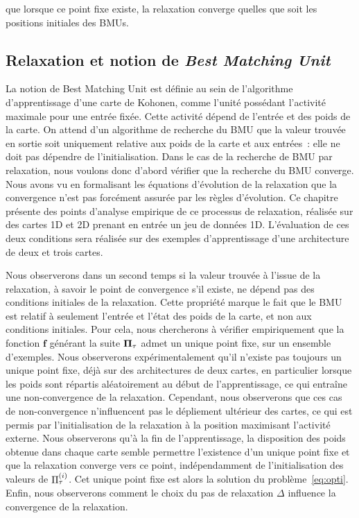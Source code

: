 \documentclass[../main]{subfiles}
\begin{document}
 que lorsque ce point fixe existe, la relaxation converge quelles que soit les positions initiales des BMUs.

\subsection{Relaxation et notion de \emph{Best Matching Unit}}

La notion de Best Matching Unit est définie au sein de l'algorithme d'apprentissage d'une carte de Kohonen, comme l'unité possédant l'activité maximale pour une entrée fixée. 
Cette activité dépend de l'entrée et des poids de la carte.
On attend d'un algorithme de recherche du BMU que la valeur trouvée en sortie soit uniquement relative aux poids de la carte et aux entrées~: elle ne doit pas dépendre de l'initialisation.
Dans le cas de la recherche de BMU par relaxation, nous voulons donc d'abord vérifier que la recherche du BMU converge.
Nous avons vu en formalisant les équations d'évolution de la relaxation que la convergence n'est pas forcément assurée par les règles d'évolution.
Ce chapitre présente des points d'analyse empirique de ce processus de relaxation, réalisée sur des cartes 1D et 2D prenant en entrée un jeu de données 1D.
L'évaluation de ces deux conditions sera réalisée sur des exemples d'apprentissage d'une architecture de deux et trois cartes. 


Nous observerons dans un second temps si la valeur trouvée à l'issue de la relaxation, à savoir le point de convergence s'il existe, ne dépend pas des conditions initiales de la relaxation.
Cette propriété marque le fait que le BMU est relatif à seulement l'entrée et l'état des poids de la carte, et non aux conditions initiales.
Pour cela, nous chercherons à vérifier empiriquement que la fonction $\mathbf{f}$ générant la suite $\mathbf{\Pi}_\tau$ admet un unique point fixe, sur un ensemble d'exemples. 
Nous observerons expérimentalement qu'il n'existe pas toujours un unique point fixe, déjà sur des architectures de deux cartes, en particulier lorsque les poids sont répartis aléatoirement au début de l'apprentissage, ce qui entraîne une non-convergence de la relaxation. 
Cependant, nous observerons que ces cas de non-convergence n'influencent pas le dépliement ultérieur des cartes, ce qui est permis par l'initialisation de la relaxation à la position maximisant l'activité externe.
Nous observerons qu'à la fin de l'apprentissage, la disposition des poids obtenue dans chaque carte semble permettre l'existence d'un unique point fixe et que la relaxation converge vers ce point, indépendamment de l'initialisation des valeurs de $\Pi^{({i})}_{\tau}$. Cet unique point fixe est alors la solution du problème~\ref{eq:opti}.
Enfin, nous observerons comment le choix du pas de relaxation $\Delta$ influence la convergence de la relaxation.
\end{document}
